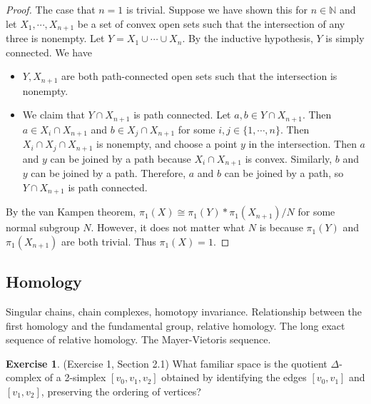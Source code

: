 \documentclass[12pt, psamsfonts]{amsart}
\theoremstyle{definition}
\newtheorem*{exer}{Exercise}
\theoremstyle{remark}
\numberwithin{equation}{section}
\begin{document}
\begin{proof}
  The case that $n = 1$ is trivial.
  Suppose we have shown this for $n \in \mathbb{N}$ and let $X_1, \cdots, X_{n + 1}$ be a set of convex open sets such that the intersection of any three is nonempty.
  Let $Y = X_1 \cup \cdots \cup X_n$.
  By the inductive hypothesis, $Y$ is simply connected.
  We have
  \begin{itemize}
    \item
      $Y, X_{n + 1}$ are both path-connected open sets such that the intersection is nonempty.
    \item
      We claim that $Y \cap X_{n + 1}$ is path connected.
      Let $a, b \in Y \cap X_{n + 1}$.
      Then $a \in X_i \cap X_{n + 1}$ and $b \in X_j \cap X_{n + 1}$ for some $i, j \in \{ 1, \cdots, n \}$.
      Then $X_i \cap X_j \cap X_{n + 1}$ is nonempty, and choose a point $y$ in the intersection.
      Then $a$ and $y$ can be joined by a path because $X_i \cap X_{n + 1}$ is convex.
      Similarly, $b$ and $y$ can be joined by a path.
      Therefore, $a$ and $b$ can be joined by a path, so $Y \cap X_{n + 1}$ is path connected.
  \end{itemize}
  By the van Kampen theorem, $\pi_1(X) \cong \pi_1(Y) * \pi_1(X_{n + 1}) / N$ for some normal subgroup $N$.
  However, it does not matter what $N$ is because $\pi_1(Y)$ and $\pi_1(X_{n + 1})$ are both trivial.
  Thus $\pi_1(X) = 1$.
\end{proof}

\subsection{Homology}
Singular chains, chain complexes, homotopy invariance.
Relationship between the first homology and the fundamental group, relative homology.
The long exact sequence of relative homology.
The Mayer-Vietoris sequence.

\begin{exer}{(Exercise 1, Section 2.1)}
  What familiar space is the quotient $\Delta$-complex of a 2-simplex $[v_0, v_1, v_2]$ obtained by identifying the edges $[v_0, v_1]$ and $[v_1, v_2]$, preserving the ordering of vertices?
\end{exer}
\end{document}
